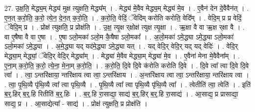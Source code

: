 \documentclass[17pt]{extarticle}
\begin{document}
27. उ॒क्ष॒ति॒ मेद्ध्य॒म् मेद्ध्य॑ मुक्ष त्युक्षति॒ मेद्ध्य᳚म् । . मेद्ध्य॑ मे॒वैव मेद्ध्य॒म् मेद्ध्य॑ मे॒व । . ए॒वैन॑ देन दे॒वैवैन॑त् । . ए॒न॒त् क॒रो॒ति॒ क॒रो॒ त्ये॒न॒ दे॒न॒त् क॒रो॒ति॒ । . क॒रो॒ति॒ वेदिं॒ ॅवेदि॑म् करोति करोति॒ वेदि᳚म् । . वेदि॒म् प्र प्र वेदिं॒ ॅवेदि॒म् प्र । . प्रोक्ष॑ त्युक्षति॒ प्र प्रोक्ष॑ति । . उ॒क्ष॒ त्यृ॒क्ष र्‌क्षोक्ष॑ त्युक्ष त्यृ॒क्षा । . ऋ॒क्षा वै वा ऋ॒क्ष र्‌क्षा वै । . वा ए॒षैषा वै वा ए॒षा । . ए॒षा ऽलो॒मका॑ ऽलो॒म कै॒षैषा ऽलो॒मका᳚ । . अ॒लो॒मका॑ ऽमे॒द्ध्या ऽमे॒द्ध्या ऽलो॒मका॑ ऽलो॒मका॑ ऽमे॒द्ध्या । . अ॒मे॒द्ध्या यद् यद॑मे॒द्ध्या ऽमे॒द्ध्या यत् । . यद् वेदि॒र् वेदि॒र् यद् यद् वेदिः॑ । . वेदि॒र् मेद्ध्या॒म् मेद्ध्यां॒ ॅवेदि॒र् वेदि॒र् मेद्ध्या᳚म् । . मेद्ध्या॑ मे॒वैव मेद्ध्या॒म् मेद्ध्या॑ मे॒व । . ए॒वैना॑ मेना मे॒वैवैना᳚म् । . ए॒ना॒म् क॒रो॒ति॒ क॒रो॒ त्ये॒ना॒ मे॒ना॒म् क॒रो॒ति॒ । . क॒रो॒ति॒ दि॒वे दि॒वे क॑रोति करोति दि॒वे । . दि॒वे त्वा᳚ त्वा दि॒वे दि॒वे त्वा᳚ । . त्वा॒ ऽन्तरि॑क्षाया॒ न्तरि॑क्षाय त्वा त्वा॒ ऽन्तरि॑क्षाय । . अ॒न्तरि॑क्षाय त्वा त्वा॒ ऽन्तरि॑क्षाया॒ न्तरि॑क्षाय त्वा । . त्वा॒ पृ॒थि॒व्यै पृ॑थि॒व्यै त्वा᳚ त्वा पृथि॒व्यै । . पृ॒थि॒व्यै त्वा᳚ त्वा पृथि॒व्यै पृ॑थि॒व्यै त्वा᳚ । . त्वेतीति॑ त्वा॒ त्वेति॑ । . इति॑ ब॒र्॒.हिर् ब॒र्॒.हि रितीति॑ ब॒र्॒.हिः । . ब॒र्॒.हि रा॒साद्या॒ साद्य॑ ब॒र्॒.हिर् ब॒र्॒.हि रा॒साद्य॑ । . आ॒साद्य॒ प्र प्रासाद्या॒ साद्य॒ प्र । . आ॒साद्येत्या᳚ - साद्य॑ । . प्रोक्ष॑ त्युक्षति॒ प्र प्रोक्ष॑ति । \newline
\end{document}
